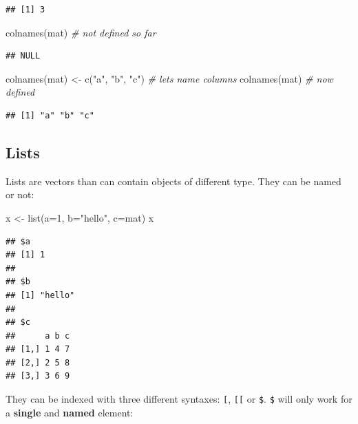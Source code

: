 \documentclass[
]{book}
\newenvironment{Shaded}{\begin{snugshade}}{\end{snugshade}}
\newcommand{\AttributeTok}[1]{\textcolor[rgb]{0.77,0.63,0.00}{#1}}
\newcommand{\CommentTok}[1]{\textcolor[rgb]{0.56,0.35,0.01}{\textit{#1}}}
\newcommand{\DecValTok}[1]{\textcolor[rgb]{0.00,0.00,0.81}{#1}}
\newcommand{\FunctionTok}[1]{\textcolor[rgb]{0.00,0.00,0.00}{#1}}
\newcommand{\NormalTok}[1]{#1}
\newcommand{\OtherTok}[1]{\textcolor[rgb]{0.56,0.35,0.01}{#1}}
\newcommand{\StringTok}[1]{\textcolor[rgb]{0.31,0.60,0.02}{#1}}
\begin{document}
\begin{verbatim}
## [1] 3
\end{verbatim}

\begin{Shaded}
\begin{Highlighting}[]
\FunctionTok{colnames}\NormalTok{(mat) }\CommentTok{\# not defined so far}
\end{Highlighting}
\end{Shaded}

\begin{verbatim}
## NULL
\end{verbatim}

\begin{Shaded}
\begin{Highlighting}[]
\FunctionTok{colnames}\NormalTok{(mat) }\OtherTok{\textless{}{-}} \FunctionTok{c}\NormalTok{(}\StringTok{"a"}\NormalTok{, }\StringTok{"b"}\NormalTok{, }\StringTok{"c"}\NormalTok{) }\CommentTok{\# let\textquotesingle{}s name columns}
\FunctionTok{colnames}\NormalTok{(mat) }\CommentTok{\# now defined}
\end{Highlighting}
\end{Shaded}

\begin{verbatim}
## [1] "a" "b" "c"
\end{verbatim}

\hypertarget{lists}{%
\subsection{Lists}\label{lists}}

Lists are vectors than can contain objects of different type. They can be named or not:

\begin{Shaded}
\begin{Highlighting}[]
\NormalTok{x }\OtherTok{\textless{}{-}} \FunctionTok{list}\NormalTok{(}\AttributeTok{a=}\DecValTok{1}\NormalTok{, }\AttributeTok{b=}\StringTok{"hello"}\NormalTok{, }\AttributeTok{c=}\NormalTok{mat)}
\NormalTok{x}
\end{Highlighting}
\end{Shaded}

\begin{verbatim}
## $a
## [1] 1
## 
## $b
## [1] "hello"
## 
## $c
##      a b c
## [1,] 1 4 7
## [2,] 2 5 8
## [3,] 3 6 9
\end{verbatim}

They can be indexed with three different syntaxes: \texttt{{[}}, \texttt{{[}{[}} or \texttt{\$}. \texttt{\$} will only work for a \textbf{single} and \textbf{named} element:
\end{document}
